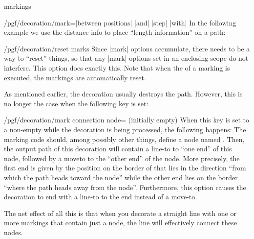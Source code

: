 \begin{decoration}{markings}
\begin{key}{/pgf/decoration/mark=|between positions|
             |and|  |step|
             |with| %
    }
        In the following example we use the distance info to place ``length
        information'' on a path:
\begin{codeexample}[]
\end{codeexample}
    \end{key}

    \begin{key}{/pgf/decoration/reset marks}
        Since |mark| options accumulate, there needs to be a way to ``reset''
        things, so that any |mark| options set in an enclosing scope do not
        interfere. This option does exactly this. Note that when the
         of a marking is executed, the markings are automatically
        reset.
    \end{key}

    As mentioned earlier, the decoration usually destroys the path. However,
    this is no longer the case when the following key is set:
    \begin{key}{/pgf/decoration/mark connection node= (initially empty)}
        When this key is set to a non-empty  while the
        decoration is being processed, the following happens: The marking code
        should, among possibly other things, define a node named . Then, the output path of this decoration will contain a line-to
        to ``one end'' of this node, followed by a moveto to the ``other end''
        of the node. More precisely, the first end is given by the position on
        the border of  that lies in the direction ``from which
        the path heads toward the node'' while the other end lies on the border
        ``where the path heads away from the node''. Furthermore, this option
        causes the decoration to end with a line-to to the end instead of a
        move-to.

        The net effect of all this is that when you decorate a straight line
        with one or more markings that contain just a node, the line will
        effectively connect these nodes.


\end{key}
\end{decoration}
